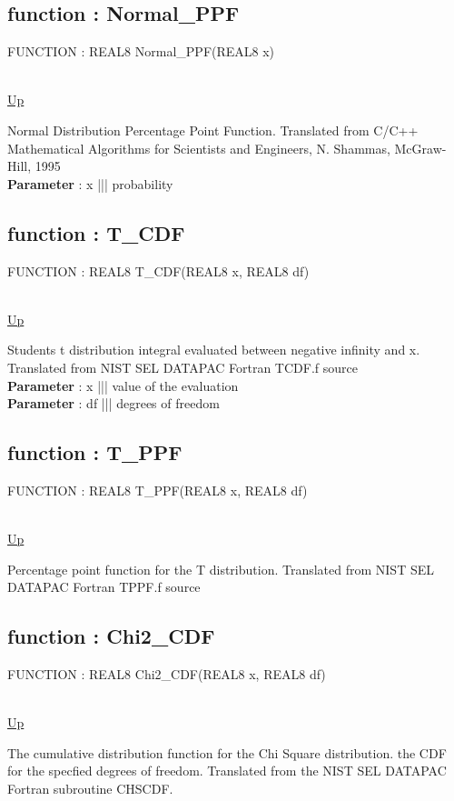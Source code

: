 \subsection*{function : Normal\_PPF}
\hypertarget{ecldoc:logisticregression.distributions.normal_ppf}{FUNCTION : REAL8 Normal\_PPF(REAL8 x)} \\
\hyperlink{ecldoc:LogisticRegression.Distributions}{Up} \\
\par
Normal Distribution Percentage Point Function. Translated from C/C++ Mathematical Algorithms for Scientists and Engineers, N. Shammas, McGraw-Hill, 1995 \\
\textbf{Parameter} : x ||| probability \\
\subsection*{function : T\_CDF}
\hypertarget{ecldoc:logisticregression.distributions.t_cdf}{FUNCTION : REAL8 T\_CDF(REAL8 x, REAL8 df)} \\
\hyperlink{ecldoc:LogisticRegression.Distributions}{Up} \\
\par
Students t distribution integral evaluated between negative infinity and x. Translated from NIST SEL DATAPAC Fortran TCDF.f source \\
\textbf{Parameter} : x ||| value of the evaluation \\
\textbf{Parameter} : df ||| degrees of freedom \\
\subsection*{function : T\_PPF}
\hypertarget{ecldoc:logisticregression.distributions.t_ppf}{FUNCTION : REAL8 T\_PPF(REAL8 x, REAL8 df)} \\
\hyperlink{ecldoc:LogisticRegression.Distributions}{Up} \\
\par
Percentage point function for the T distribution. Translated from NIST SEL DATAPAC Fortran TPPF.f source \\
\subsection*{function : Chi2\_CDF}
\hypertarget{ecldoc:logisticregression.distributions.chi2_cdf}{FUNCTION : REAL8 Chi2\_CDF(REAL8 x, REAL8 df)} \\
\hyperlink{ecldoc:LogisticRegression.Distributions}{Up} \\
\par
The cumulative distribution function for the Chi Square distribution. the CDF for the specfied degrees of freedom. Translated from the NIST SEL DATAPAC Fortran subroutine CHSCDF. \\
